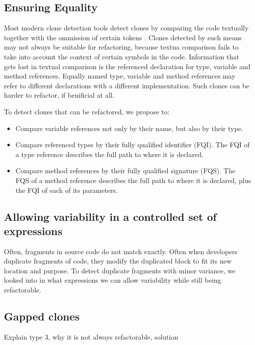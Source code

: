 \documentclass[conference]{IEEEtran}
\begin{document}
\subsection{Ensuring Equality}
Most modern clone detection tools detect clones by comparing the code textually together with the ommission of certain tokens \cite{roy2009comparison, svajlenko2014evaluating}. Clones detected by such means may not always be suitable for refactoring, because textua comparison fails to take into account the context of certain symbols in the code. Information that gets lost in textual comparison is the referenced declaration for type, variable and method references. Equally named type, variable and method references may refer to different declarations with a different implementation. Such clones can be harder to refactor, if benificial at all.

To detect clones that can be refactored, we propose to:
\begin{itemize}
  \item Compare variable references not only by their name, but also by their type.
  \item Compare referenced types by their fully qualified identifier (FQI). The FQI of a type reference describes the full path to where it is declared.
  \item Compare method references by their fully qualified signature (FQS). The FQS of a method reference describes the full path to where it is declared, plus the FQI of each of its parameters.
\end{itemize}


\subsection{Allowing variability in a controlled set of expressions}
Often, fragments in source code do not match exactly. Often when developers duplicate fragments of code, they modify the duplicated block to fit its new location and purpose. To detect duplicate fragments with minor variance, we looked into in what expressions we can allow variability while still being refactorable.

\subsection{Gapped clones}
Explain type 3, why it is not always refactorable, solution
\end{document}
